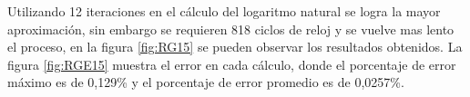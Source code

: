 Utilizando 12 iteraciones en el cálculo del logaritmo natural se logra la mayor aproximación, sin embargo se requieren 818 ciclos de reloj y se vuelve mas lento el proceso, en la figura \ref{fig:RG15} se pueden observar los resultados obtenidos. La figura \ref{fig:RGE15} muestra el error en cada cálculo, donde el porcentaje de error máximo es de  0,129\% y el porcentaje de error promedio es de 0,0257\%. 



    